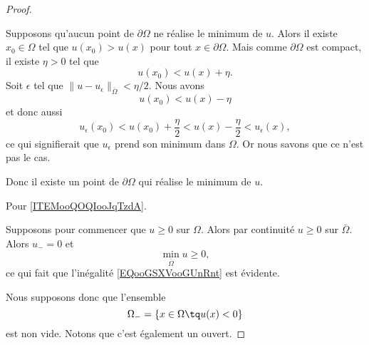 \begin{proof}
\begin{subproof}
            Supposons qu'aucun point de \( \partial \Omega\) ne réalise le minimum de \( u\). Alors il existe \( x_0\in \Omega\) tel que \( u(x_0)>u(x)\) pour tout \( x\in \partial \Omega\). Mais comme \( \partial\Omega\) est compact, il existe \( \eta>0\) tel que
            \begin{equation}
                u(x_0)<u(x)+\eta.
            \end{equation}
            Soit \( \epsilon\) tel que \( \| u-u_{\epsilon} \|_{\bar \Omega}< \eta/2\). Nous avons
            \begin{equation}
                u(x_0)<u(x)-\eta
            \end{equation}
            et donc aussi
            \begin{equation}
                u_{\epsilon}(x_0)<u(x_0)+\frac{ \eta }{2}<u(x)-\frac{ \eta }{2}<u_{\epsilon}(x),
            \end{equation}
            ce qui signifierait que \( u_{\epsilon}\) prend son minimum dans \( \Omega\). Or nous savons que ce n'est pas le cas.

            Donc il existe un point de \( \partial\Omega\) qui réalise le minimum de \( u\).

    \end{subproof}

    Pour \ref{ITEMooQOQIooJqTzdA}.

    Supposons pour commencer que \( u\geq 0\) sur \( \Omega\). Alors par continuité \( u\geq 0\) sur \( \bar \Omega\). Alors \( u_-=0\) et
    \begin{equation}
        \min_{\bar\Omega}u\geq 0,
    \end{equation}
    ce qui fait que l'inégalité \eqref{EQooGSXVooGUnRnt} est évidente.

    Nous supposons donc que l'ensemble
    \begin{equation}
        \Omega_-=\{ x\in \Omega\tq u(x)<0 \}
    \end{equation}
    est non vide. Notons que c'est également un ouvert.


\end{proof}
